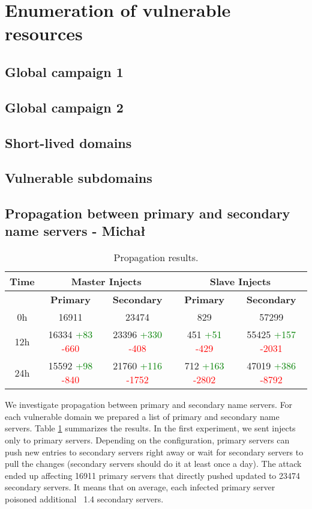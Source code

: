 \section{Enumeration of vulnerable resources}
\subsection{Global campaign 1}
\subsection{Global campaign 2}
\subsection{Short-lived domains}
\subsection{Vulnerable subdomains}
\subsection{Propagation between primary and secondary name servers - Michał}
\begin{table}[h!]
\begin{center}
\begin{tabular}{| c | c | c | c | c|} 
\hline
\textbf{Time} & \multicolumn{2}{|c|}{\textbf{Master Injects}} & \multicolumn{2}{|c|}{\textbf{Slave Injects}} \\
\hline
& \textbf{Primary} & \textbf{Secondary} & \textbf{Primary} & \textbf{Secondary}\\ 
\hline
0h & 16911 & 23474 & 829 & 57299\\ 
\hline 
12h & 16334 \textcolor{green}{+83} \textcolor{red}{-660}& 23396 \textcolor{green}{+330} \textcolor{red}{-408}& 451 \textcolor{green}{+51} \textcolor{red}{-429}& 55425 \textcolor{green}{+157} \textcolor{red}{-2031} \\ 
\hline 
24h & 15592 \textcolor{green}{+98} \textcolor{red}{-840} & 21760 \textcolor{green}{+116} \textcolor{red}{-1752} & 712 \textcolor{green}{+163} \textcolor{red}{-2802} & 47019 \textcolor{green}{+386} \textcolor{red}{-8792} \\ 
\hline 
\end{tabular}
\end{center}
\caption{Propagation results.}
\label{tab:propagation}
\end{table}
We investigate propagation between primary and secondary name servers. For each vulnerable domain we prepared a list of primary and secondary name servers. Table \ref{tab:propagation} summarizes the results. In the first experiment, we sent injects only to primary servers. Depending on the configuration, primary servers can push new entries to secondary servers right away or wait for secondary servers to pull the changes (secondary servers should do it at least once a day). The attack ended up affecting 16911 primary servers that directly pushed updated to 23474 secondary servers. It means that on average, each infected primary server poisoned additional ~1.4 secondary servers.


